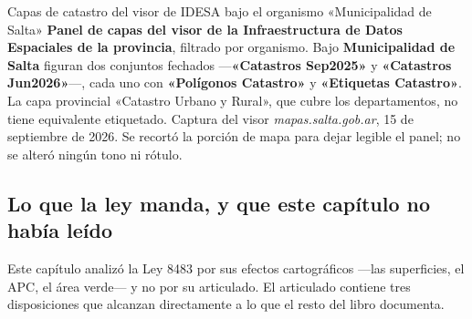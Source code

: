 %
{Capas de catastro del visor de IDESA bajo el organismo «Municipalidad de Salta»}%
{\textbf{Panel de capas del visor de la Infraestructura de Datos Espaciales de la provincia},
filtrado por organismo. Bajo \textbf{Municipalidad de Salta} figuran dos conjuntos fechados
---\textbf{«Catastros Sep2025»} y \textbf{«Catastros Jun2026»}---, cada uno con
\textbf{«Polígonos Catastro»} y \textbf{«Etiquetas Catastro»}. La capa provincial «Catastro
Urbano y Rural», que cubre los departamentos, no tiene equivalente etiquetado.}%
{Captura del visor \textit{mapas.salta.gob.ar}, 15 de septiembre de 2026. Se recortó la
porción de mapa para dejar legible el panel; no se alteró ningún tono ni rótulo.}

\subsection*{Lo que la ley manda, y que este capítulo no había leído}

Este capítulo analizó la Ley 8483 por sus efectos cartográficos ---las superficies, el APC, el
área verde--- y no por su articulado. El articulado contiene tres disposiciones que alcanzan
directamente a lo que el resto del libro documenta.

